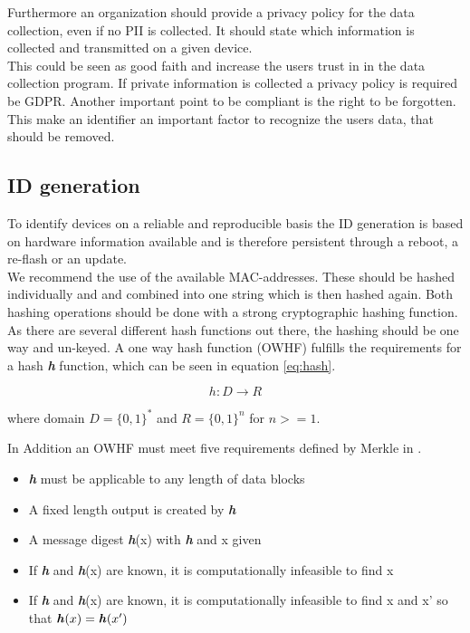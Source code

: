         Furthermore an organization should provide a privacy policy for the data collection, even if no PII is collected. It should state which information is collected and transmitted on a given device.\\
        This could be seen as good faith and increase the users trust in in the data collection program. If private information is collected a privacy policy is required be GDPR. Another important point to be compliant is the right to be forgotten. This make an identifier an important factor to recognize the users data, that should be removed.
        
          
    \subsection{ID generation}
        \label{subsec:software_design:id}
        To identify devices on a reliable and reproducible basis the ID generation is based on hardware information available and is therefore persistent through a reboot, a re-flash or an update.\\
        We recommend the use of the available MAC-addresses. These should be hashed individually and and combined into one string which is then hashed again. Both hashing operations should be done with a strong cryptographic hashing function.
        As there are several different hash functions out there, the hashing should be one way and un-keyed. A one way hash function (OWHF) fulfills the requirements for a hash \textbf{\textit{h}} function, which can be seen in equation \ref{eq:hash}\cite{sobti_cryptographic_2012}.
        
        \begin{equation}
            \label{eq:hash}
            h : D \longrightarrow R
        \end{equation}
        
        where domain $D = \{0,1\}^*$ and $R=\{0,1\}^n$ for $n >= 1$.
        
        In Addition an OWHF must meet five requirements defined by Merkle in \cite{merkle_secrecy_1979}.
        \begin{itemize}
            \item \textbf{\textit{h}} must be applicable to any length of data blocks
            \item A fixed length output is created by \textbf{\textit{h}}
            \item A message digest \textbf{\textit{h}}(x) with \textbf{\textit{h}} and x given
            \item If \textbf{\textit{h}} and \textbf{\textit{h}}(x) are known, it is computationally infeasible to find x
            \item If \textbf{\textit{h}} and \textbf{\textit{h}}(x) are known, it is computationally infeasible to find x and x' so that $\textbf{\textit{h}}(x) = \textbf{\textit{h}}(x')$
        \end{itemize}
        
